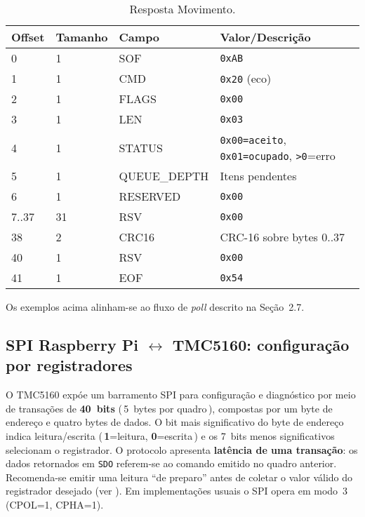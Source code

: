 \begin{table}[h]
  \centering
  \caption{Resposta Movimento.}
  \label{tab:spi-move-rsp}
  \setlength{\tabcolsep}{4pt}\footnotesize
  \begin{tabularx}{\textwidth}{lllX}
    \toprule
    Offset & Tamanho & Campo & Valor/Descri\c{c}\~ao \\
    \midrule
    0 & 1 & SOF & \texttt{0xAB} \\
    1 & 1 & CMD & \texttt{0x20} (eco) \\
    2 & 1 & FLAGS & \texttt{0x00} \\
    3 & 1 & LEN & \texttt{0x03} \\
    4 & 1 & STATUS & \texttt{0x00=aceito}, \texttt{0x01=ocupado}, \texttt{\textgreater 0}=erro \\
    5 & 1 & QUEUE\_DEPTH & Itens pendentes \\
    6 & 1 & RESERVED & \texttt{0x00} \\
    7..37 & 31 & RSV & \texttt{0x00} \\
    38 & 2 & CRC16 & CRC-16 sobre bytes 0..37 \\
    40 & 1 & RSV & \texttt{0x00} \\
    41 & 1 & EOF & \texttt{0x54} \\
    \bottomrule
  \end{tabularx}
\end{table}

Os exemplos acima alinham-se ao fluxo de \emph{poll} descrito na Se\c{c}\~ao~2.7.

\subsection*{SPI Raspberry Pi \texorpdfstring{$\leftrightarrow$}{<->} TMC5160: configura\c{c}\~ao por registradores}

O TMC5160 exp\'oe um barramento SPI para configura\c{c}\~ao e diagn\'ostico por meio de
transa\c{c}\~oes de \textbf{40~bits} (\,5~bytes por quadro\,), compostas por um byte de
endere\c{c}o e quatro bytes de dados. O bit mais significativo do byte de
endere\c{c}o indica leitura/escrita (\,\textbf{1}=leitura, \textbf{0}=escrita\,) e
os 7~bits menos significativos selecionam o registrador. O protocolo apresenta
\textbf{lat\^encia de uma transa\c{c}\~ao}: os dados retornados em \texttt{SDO} referem-se
ao comando emitido no quadro anterior. Recomenda-se emitir uma leitura “de
preparo” antes de coletar o valor v\'alido do registrador desejado
(ver \cite{tmc5160_ds}). Em implementa\c{c}\~oes usuais o SPI opera em modo~3
(CPOL=1, CPHA=1).

